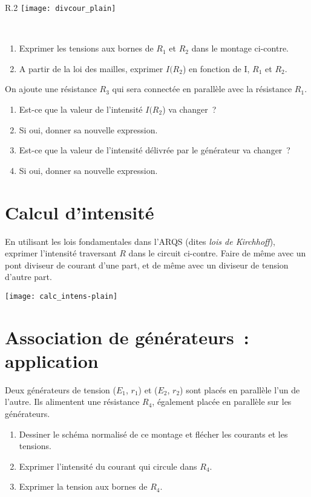 \documentclass[a4paper, 12pt, final, garamond]{book}
\begin{document}
\begin{wrapfigure}[10]{R}{.2\linewidth}
    \vspace{60pt}
    \centering
    \texttt{[image: divcour\_plain]}
\end{wrapfigure}
~
\begin{enumerate}
    \item Exprimer les tensions aux bornes de $R_1$ et $R_2$ dans le montage
        ci-contre.
    \item A partir de la loi des mailles, exprimer $I(R_2$) en fonction de I,
        $R_1$ et $R_2$.
\end{enumerate}
On ajoute une résistance $R_3$ qui sera connectée en parallèle avec la
résistance $R_1$.
\begin{enumerate}[resume]
    \item Est-ce que la valeur de l'intensité $I(R_2$) va changer~?
    \item Si oui, donner sa nouvelle expression.
    \item Est-ce que la valeur de l'intensité délivrée par le générateur va
        changer~?
    \item Si oui, donner sa nouvelle expression.
\end{enumerate}

\section{Calcul d'intensité}

\begin{minipage}{0.45\linewidth} En utilisant les lois fondamentales dans l'ARQS
    (dites \textit{lois de Kirchhoff}), exprimer l'intensité traversant $R$ dans
    le circuit ci-contre. Faire de même avec un pont diviseur de courant d'une
    part, et de même avec un diviseur de tension d'autre part.
\end{minipage}
\begin{minipage}{0.45\linewidth}
    \begin{center}
        \texttt{[image: calc\_intens-plain]}
    \end{center}
\end{minipage}

\section{Association de générateurs~: application}

Deux générateurs de tension ($E_1$, $r_1$) et ($E_2$, $r_2$) sont placés en
parallèle l'un de l'autre. Ils alimentent une résistance $R_4$, également placée
en parallèle sur les générateurs.
\begin{enumerate}
    \item Dessiner le schéma normalisé de ce montage et flécher les courants et
        les tensions.
    \item Exprimer l'intensité du courant qui circule dans $R_4$.
    \item Exprimer la tension aux bornes de $R_4$.
\end{enumerate}
\end{document}

